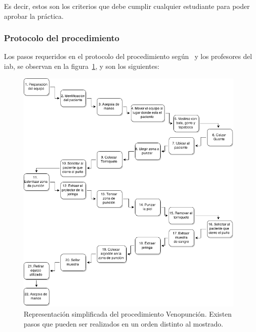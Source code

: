 Es decir, estos son los criterios que debe cumplir cualquier estudiante
para poder aprobar la práctica.

\subsubsection{Protocolo del procedimiento}
\label{sec:hemocultivo_protocolo}

Los pasos requeridos en el protocolo del procedimiento según~\cite{oms:extraccion}
y los profesores del \Gls{iab}, se observan en la figura~\ref{fig:proc_hemocultivo}, y
son los siguientes:

\begin{figure}
\centering
\includegraphics[scale=0.5]{requerimientos/images/hemocultivo.png}
\caption{Representación simplificada del procedimiento Venopunción. Existen pasos que pueden ser realizados en un orden distinto al mostrado.}
\label{fig:proc_hemocultivo}
\end{figure}

